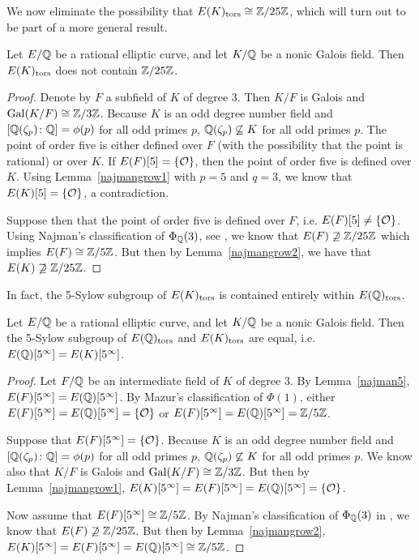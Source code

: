 We now eliminate the possibility that $E(K)_{\text{tors}} \cong \mathbb{Z}/25\mathbb{Z}$, which will turn out to be part of a more general result. 


\begin{lem} \label{no25}
Let $E/\mathbb{Q}$ be a rational elliptic curve, and let $K/\mathbb{Q}$ be a nonic Galois field. Then $E(K)_{\text{tors}}$ does not contain $\mathbb{Z}/25\mathbb{Z}$.
\end{lem}

\begin{proof}
Denote by $F$ a subfield of $K$ of degree 3. Then $K/F$ is Galois and $\operatorname{Gal}(K/F) \cong \mathbb{Z}/3\mathbb{Z}$. Because $K$ is an odd degree number field and $[\mathbb{Q}(\zeta_p) \colon \mathbb{Q}]= \phi(p)$ for all odd primes $p$, $\mathbb{Q}(\zeta_p) \not\subseteq K$ for all odd primes $p$. The point of order five is either defined over $F$ (with the possibility that the point is rational) or over $K$. If $E(F)[5]= \{ \mathcal{O} \}$, then the point of order five is defined over $K$. Using Lemma~\ref{najmangrow1} with $p= 5$ and $q=3$, we know that $E(K)[5]= \{ \mathcal{O} \}$, a contradiction. 
 
Suppose then that the point of order five is defined over $F$, i.e. $E(F)[5] \neq \{ \mathcal{O} \}$. Using Najman's classification of $\Phi_{\mathbb{Q}}(3)$, see \cite{najman16}, we know that $E(F) \not\supseteq \mathbb{Z}/25\mathbb{Z}$ which implies $E(F) \cong \mathbb{Z}/5\mathbb{Z}$. But then by Lemma~\ref{najmangrow2}, we have that $E(K) \not\supseteq \mathbb{Z}/25\mathbb{Z}$. 
\end{proof}  


In fact, the 5-Sylow subgroup of $E(K)_{\text{tors}}$ is contained entirely within $E(\mathbb{Q})_{\text{tors}}$.


\begin{lem} \label{nonic5sylow}
Let $E/\mathbb{Q}$ be a rational elliptic curve, and let $K/\mathbb{Q}$ be a nonic Galois field. Then the 5-Sylow subgroup of $E(\mathbb{Q})_{\text{tors}}$ and $E(K)_{\text{tors}}$ are equal, i.e. $E(\mathbb{Q})[5^\infty]= E(K)[5^\infty]$.
\end{lem}

\begin{proof}
Let $F/\mathbb{Q}$ be an intermediate field of $K$ of degree 3. By Lemma~\ref{najman5}, $E(F)[5^\infty]= E(\mathbb{Q})[5^\infty]$. By Mazur's classification of $\Phi(1)$, either $E(F)[5^\infty]= E(\mathbb{Q})[5^\infty]= \{ \mathcal{O} \}$ or  $E(F)[5^\infty]= E(\mathbb{Q})[5^\infty]= \mathbb{Z}/5\mathbb{Z}$. 

Suppose that $E(F)[5^\infty]= \{ \mathcal{O} \}$. Because $K$ is an odd degree number field and $[\mathbb{Q}(\zeta_p) \colon \mathbb{Q}]= \phi(p)$ for all odd primes $p$, $\mathbb{Q}(\zeta_p) \not\subseteq K$ for all odd primes $p$. We know also that $K/F$ is Galois and $\operatorname{Gal}(K/F) \cong \mathbb{Z}/3\mathbb{Z}$. But then by Lemma~\ref{najmangrow1}, $E(K)[5^\infty]= E(F)[5^\infty]= E(\mathbb{Q})[5^\infty]= \{ \mathcal{O} \}$. 

Now assume that $E(F)[5^\infty] \cong \mathbb{Z}/5\mathbb{Z}$. By Najman's classification of $\Phi_{\mathbb{Q}}(3)$ in \cite{najman16}, we know that $E(F) \not\supseteq \mathbb{Z}/25\mathbb{Z}$. But then by Lemma~\ref{najmangrow2}, $E(K)[5^\infty]= E(F)[5^\infty]= E(\mathbb{Q})[5^\infty] \cong \mathbb{Z}/5\mathbb{Z}$.
\end{proof}


